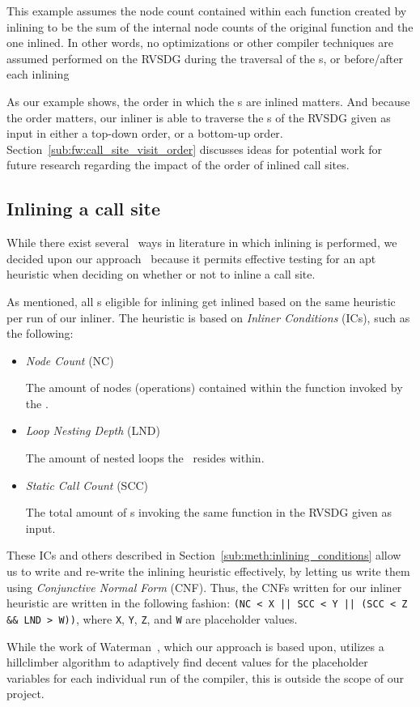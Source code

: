 This example assumes the node count contained within each
function created by inlining to be the sum of the internal node counts of the
original function and the one inlined. In other words, no optimizations or other
compiler techniques are assumed performed on the RVSDG during the traversal of
the \applyNode s, or before/after each inlining

As our example shows, the order in which the \applyNode s are inlined matters.
And because the order matters, our inliner is able to traverse the \applyNode s
of the RVSDG given as input in either a top-down order, or a bottom-up order.
Section~\ref{sub:fw:call_site_visit_order} discusses ideas for potential work
for future research regarding the impact of the order of inlined call sites.

\subsection{Inlining a call site}
\label{sub:scheme:inlining_apply_nodes}

While there exist several~\cite{GHCPaper,AdaptvStratInlSubst} ways in literature
in which inlining is performed, we decided upon our
approach~\cite{AdaptvCompilAndInlingWaterman} because it permits effective
testing for an apt heuristic when deciding on whether or not to inline a call
site.

As mentioned, all \applyNode s eligible for inlining get inlined based on the
same heuristic per run of our inliner. The heuristic is based on \textit{Inliner
Conditions} (ICs), such as the following:

\begin{itemize}
	\item \textit{Node Count} (NC)

The amount of nodes (operations) contained within the function invoked by the
\applyNode .

	\item \textit{Loop Nesting Depth} (LND)

The amount of nested loops the \applyNode~resides within.

	\item \textit{Static Call Count} (SCC)

The total amount of \applyNode s invoking the same function in the RVSDG given
as input.
\end{itemize}

These ICs and others described in Section~\ref{sub:meth:inlining_conditions}
allow us to write and re-write the inlining heuristic effectively, by letting us
write them using \textit{Conjunctive Normal Form} (CNF). Thus, the CNFs written
for our inliner heuristic are written in the following fashion:
\lstinline"(NC < X || SCC < Y || (SCC < Z && LND > W))", where \lstinline!X!,
\lstinline!Y!, \lstinline!Z!, and \lstinline!W! are placeholder values.

While the work of Waterman~\cite{AdaptvCompilAndInlingWaterman}, which our
approach is based upon, utilizes a hillclimber algorithm to adaptively find
decent values for the placeholder variables for each individual run of the
compiler, this is outside the scope of our project.
